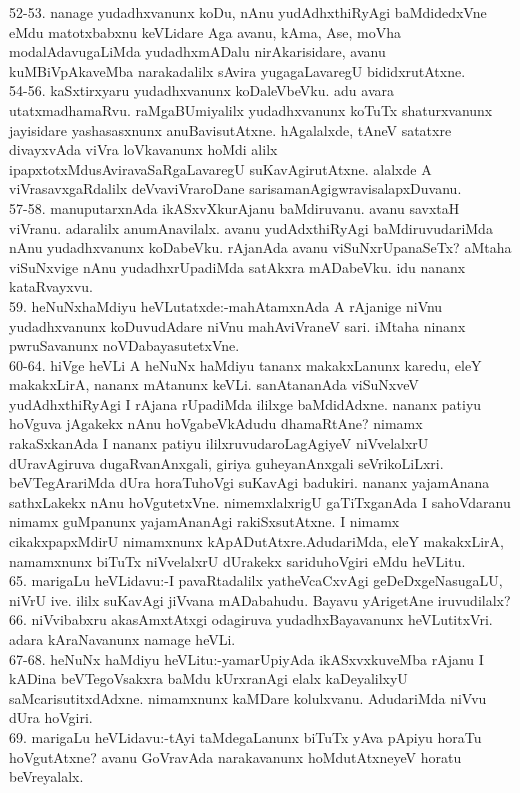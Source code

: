 \documentclass{article}
\begin{document}
52-53. nanage yudadhxvanunx koDu, nAnu yudAdhxthiRyAgi baMdidedxVne eMdu matotxbabxnu keVLidare Aga avanu, kAma, Ase, moVha modalAdavugaLiMda yudadhxmADalu nirAkarisidare, avanu kuMBiVpAkaveMba narakadalilx sAvira yugagaLavaregU bididxrutAtxne.\\
54-56. kaSxtirxyaru yudadhxvanunx koDaleVbeVku. adu avara utatxmadhamaRvu. raMgaBUmiyalilx yudadhxvanunx koTuTx shaturxvanunx jayisidare yashasasxnunx anuBavisutAtxne. hAgalalxde, tAneV satatxre divayxvAda viVra loVkavanunx hoMdi alilx ipapxtotxMdusAviravaSaRgaLavaregU suKavAgirutAtxne. alalxde A viVrasavxgaRdalilx deVvaviVraroDane sarisamanAgigwravisalapxDuvanu.\\
57-58. manuputarxnAda ikASxvXkurAjanu baMdiruvanu. avanu savxtaH viVranu. adaralilx anumAnavilalx. avanu yudAdxthiRyAgi baMdiruvudariMda nAnu yudadhxvanunx koDabeVku. rAjanAda avanu viSuNxrUpanaSeTx? aMtaha viSuNxvige nAnu yudadhxrUpadiMda satAkxra mADabeVku. idu nananx kataRvayxvu.\\
59. heNuNxhaMdiyu heVLutatxde:-mahAtamxnAda A rAjanige niVnu yudadhxvanunx koDuvudAdare niVnu mahAviVraneV sari. iMtaha ninanx pwruSavanunx noVDabayasutetxVne.\\
60-64. hiVge heVLi A heNuNx haMdiyu tananx makakxLanunx karedu, eleY makakxLirA, nananx mAtanunx keVLi. sanAtananAda viSuNxveV yudAdhxthiRyAgi I rAjana rUpadiMda ililxge baMdidAdxne. nananx patiyu hoVguva jAgakekx nAnu hoVgabeVkAdudu dhamaRtAne? nimamx rakaSxkanAda I nananx patiyu ililxruvudaroLagAgiyeV niVvelalxrU dUravAgiruva dugaRvanAnxgali, giriya guheyanAnxgali seVrikoLiLxri. beVTegArariMda dUra horaTuhoVgi suKavAgi badukiri. nananx yajamAnana sathxLakekx nAnu hoVgutetxVne. nimemxlalxrigU gaTiTxganAda I sahoVdaranu nimamx guMpanunx yajamAnanAgi rakiSxsutAtxne. I nimamx cikakxpapxMdirU nimamxnunx kApADutAtxre.AdudariMda, eleY makakxLirA, namamxnunx biTuTx niVvelalxrU dUrakekx sariduhoVgiri eMdu heVLitu.\\
65. marigaLu heVLidavu:-I pavaRtadalilx yatheVcaCxvAgi geDeDxgeNasugaLU, niVrU ive. ililx suKavAgi jiVvana mADabahudu. Bayavu yArigetAne iruvudilalx?\\
66. niVvibabxru akasAmxtAtxgi odagiruva yudadhxBayavanunx heVLutitxVri. adara kAraNavanunx namage heVLi.\\
67-68. heNuNx haMdiyu heVLitu:-yamarUpiyAda ikASxvxkuveMba rAjanu I kADina beVTegoVsakxra baMdu kUrxranAgi elalx kaDeyalilxyU saMcarisutitxdAdxne. nimamxnunx kaMDare kolulxvanu. AdudariMda niVvu dUra hoVgiri.\\
69. marigaLu heVLidavu:-tAyi taMdegaLanunx biTuTx yAva pApiyu horaTu hoVgutAtxne? avanu GoVravAda narakavanunx hoMdutAtxneyeV horatu beVreyalalx.\\
\end{document}
